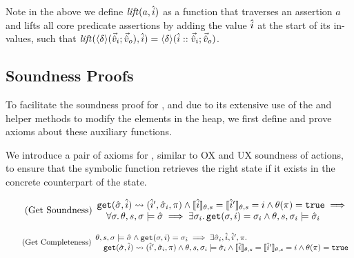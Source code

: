 Note in the above we define ${\operatorname{\mathit{lift}}}(a,\hat{i})$ as a function that traverses an assertion $a$ and lifts all core predicate assertions by adding the value $\hat{i}$ at the start of its in-values, such that ${\operatorname{\mathit{lift}}}(\left<\delta\right>\!(\vec{\hat{v}}_i;\vec{\hat{v}}_o), \hat{i})=\left<\delta\right>\!(\hat{i}::\vec{\hat{v}}_i;\vec{\hat{v}}_o)$.

\subsection{Soundness Proofs}

To facilitate the soundness proof for \PMap, and due to its extensive use of the  and  helper methods to modify the elements in the heap, we first define and prove axioms about these auxiliary functions.

We introduce a pair of axioms for , similar to OX and UX soundness of actions, to ensure that the symbolic function retrieves the right state if it exists in the concrete counterpart of the state. 

\begin{equation}
\tag{Get Soundness}\label{eq:get-sound}
\begin{array}{l}
\texttt{get}(\hat{\sigma},\hat{i})\rightsquigarrow(\hat{i}', \hat{\sigma}_i, \pi) \land \llbracket\hat{i}\rrbracket_{\theta,s}=\llbracket\hat{i}'\rrbracket_{\theta,s}=i \land \theta(\pi)=\texttt{true} \implies \\
\quad \forall \sigma\ldotp \theta,s,\sigma \models \hat{\sigma} \implies \exists \sigma_i \ldotp \texttt{get}(\sigma, i)=\sigma_i \land \theta,s,\sigma_i \models \hat{\sigma}_i
\end{array}
\end{equation}

\begin{equation}
\tag{Get Completeness}\label{eq:get-complete}
\begin{array}{l}
\theta,s,\sigma \models \hat{\sigma} \land \texttt{get}(\sigma, i)=\sigma_i \implies \exists \hat{\sigma}_i, \hat{i}, \hat{i}', \pi \ldotp \\
\quad \texttt{get}(\hat{\sigma},\hat{i})\rightsquigarrow(\hat{i}', \hat{\sigma}_i, \pi) \land \theta,s,\sigma_i\models\hat{\sigma}_i \land \llbracket\hat{i}\rrbracket_{\theta,s}=\llbracket\hat{i}'\rrbracket_{\theta,s}=i \land \theta(\pi)=\texttt{true}
\end{array}
\end{equation}


